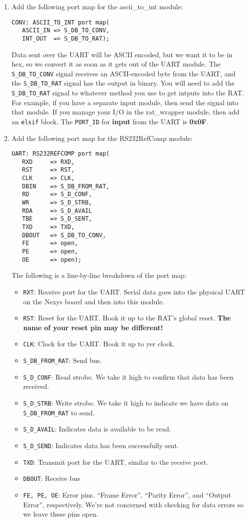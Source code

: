 \documentclass[notitlepage]{article}
\begin{document}
\begin {enumerate}
\item Add the following port map for the ascii\_to\_int module:
\begin{verbatim}
CONV: ASCII_TO_INT port map(
   ASCII_IN => S_DB_TO_CONV,
   INT_OUT  => S_DB_TO_RAT);
\end{verbatim}
Data sent over the UART will be ASCII encoded, but we want it to be in hex, so we convert it as soon as it gets out of the UART module. The \texttt{S\_DB\_TO\_CONV} signal receives an ASCII-encoded byte from the UART, and the \texttt{S\_DB\_TO\_RAT} signal has the output in binary. You will need to add the \texttt{S\_DB\_TO\_RAT} signal to whatever method you use to get intputs into the RAT. For example, if you have a  separate input module, then send the signal into that module. If you manage your I/O in the rat\_wrapper module, then add an \texttt{elsif} block. The \texttt{PORT\_ID} for \textbf{input} from the UART is \textbf{0x0F}.

\item Add the following port map for the RS232RefComp module:
\begin{verbatim}
UART: RS232REFCOMP port map(
   RXD     => RXD,
   RST     => RST,
   CLK     => CLK,
   DBIN    => S_DB_FROM_RAT,
   RD      => S_D_CONF,
   WR      => S_D_STRB,
   RDA     => S_D_AVAIL
   TBE     => S_D_SENT,
   TXD     => TXD,
   DBOUT   => S_DB_TO_CONV,
   FE      => open,
   PE      => open,
   OE      => open);
\end{verbatim}
The following is a line-by-line breakdown of the port map:
\begin{itemize}
\item \texttt{RXT}: Receive port for the UART. Serial data goes into the physical UART on the Nexys board and then into this module.
\item \texttt{RST}: Reset for the UART. Hook it up to the RAT's global reset. \textbf{The name of your reset pin may be different!}
\item \texttt{CLK}: Clock for the UART. Hook it up to yer clock. 
\item \texttt{S\_DB\_FROM\_RAT}: Send bus.
\item \texttt{S\_D\_CONF}: Read strobe. We take it high to confirm that data has been received.
\item \texttt{S\_D\_STRB}: Write strobe. We take it high to indicate we have data on \texttt{S\_DB\_FROM\_RAT} to send.
\item \texttt{S\_D\_AVAIL}: Indicates data is available to be read.
\item \texttt{S\_D\_SEND}: Indicates data has been successfully sent.
\item \texttt{TXD}: Transmit port for the UART, similar to the receive port.
\item \texttt{DBOUT}: Receive bus
\item \texttt{FE, PE, OE}: Error pins. ``Frame Error'', ``Parity Error'', and ``Output Error'', respectively. We're not concerned with checking for data errors so we leave these pins open.
\end{itemize}


\end{enumerate}
\end{document}
